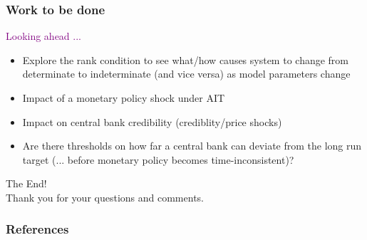 \documentclass{beamer}
\begin{document}
\begin{frame}
	\frametitle{Work to be done}
	\textcolor{purple}{Looking ahead ...}
	\begin{itemize}
		\setlength{\itemsep}{1em}
		\item Explore the rank condition to see what/how causes system to change from determinate to indeterminate (and vice versa) as model parameters change
		\item Impact of a monetary policy shock under AIT
		\item Impact on central bank credibility (crediblity/price shocks)
		\item Are there thresholds on how far a central bank can deviate from the long run target (... before monetary policy becomes time-inconsistent)?
	\end{itemize}
\end{frame}

\begin{frame}
	\centering
	The End! \\
	Thank you for your questions and comments.
\end{frame}

\appendix
\begin{frame}[allowframebreaks]
	\frametitle{References}
	
	
\end{frame}
\end{document}
